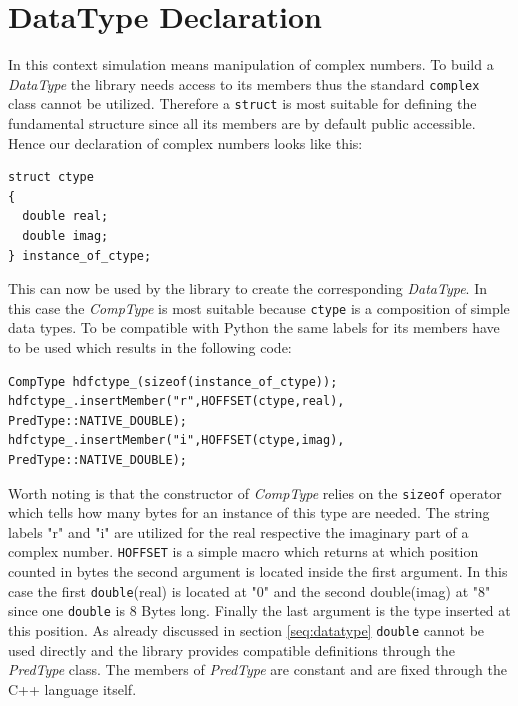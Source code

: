 \section{DataType Declaration}
\label{seq:datatypedec}
In this context simulation means manipulation of complex numbers. To build a \textit{DataType} the library needs access to its members thus the standard \texttt{complex} class cannot be utilized. Therefore a \texttt{struct} is most suitable for defining the fundamental structure since all its members are by default public accessible. Hence our declaration of complex numbers looks like this:
\begin{lstlisting}
struct ctype
{
  double real;
  double imag;
} instance_of_ctype;
\end{lstlisting}
This can now be used by the library to create the corresponding \textit{DataType}. In this case the \textit{CompType} is most suitable because \texttt{ctype} is a composition of simple data types. To be compatible with Python the same labels for its members have to be used which results in the following code:
\begin{lstlisting}
CompType hdfctype_(sizeof(instance_of_ctype));
hdfctype_.insertMember("r",HOFFSET(ctype,real), PredType::NATIVE_DOUBLE);
hdfctype_.insertMember("i",HOFFSET(ctype,imag), PredType::NATIVE_DOUBLE);
\end{lstlisting}
Worth noting is that the constructor of \textit{CompType} relies on the \texttt{sizeof} operator which tells how many bytes for an instance of this type are needed. The string labels "r" and "i" are utilized for the real respective the imaginary part of a complex number. \texttt{HOFFSET} is a simple macro which returns at which position counted in bytes the second argument is located inside the first argument. In this case the first \texttt{double}(real) is located at "0" and the second double(imag) at "8" since one \texttt{double} is $8$ Bytes long. Finally the last argument is the type inserted at this position. As already discussed in section \ref{seq:datatype} \texttt{double} cannot be used directly and the library provides compatible definitions through the \textit{PredType} class. The members of \textit{PredType} are constant and are fixed through the C++ language itself.\\

